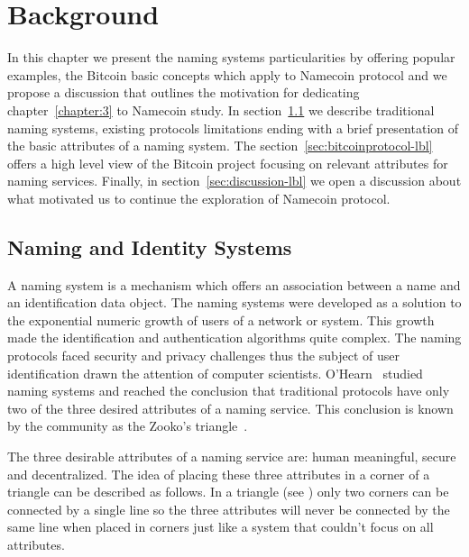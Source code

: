 \chapter{Background}
\label{chapter:2}


In this chapter we present the naming systems particularities by offering popular examples, the Bitcoin basic concepts which apply to Namecoin protocol and we propose a discussion that outlines the motivation for dedicating chapter~\ref{chapter:3} to Namecoin study. In section~\ref{sec:nmc-lbl} we describe traditional naming systems, existing protocols limitations ending with a brief presentation of the basic attributes of a naming system. The section~\ref{sec:bitcoinprotocol-lbl} offers a high level view of the Bitcoin project focusing on relevant attributes for naming services.
Finally, in section~\ref{sec:discussion-lbl} we open a discussion about what motivated us to continue the exploration of Namecoin protocol.

\section{Naming and Identity Systems}
\label{sec:nmc-lbl}
A naming system is a mechanism which offers an association between a name and an identification data object. The naming systems were developed as a solution to the exponential numeric growth of users of a network or system. This growth made the identification and authentication algorithms quite complex. The naming protocols faced security and privacy challenges thus the subject of user identification drawn the attention of computer scientists. O’Hearn~\cite{wilcox2001names} studied naming systems and reached the conclusion that traditional protocols have only two of the three desired attributes of a naming service. This conclusion is known by the community as the Zooko’s triangle~\cite{wilcox2001names}.

The three desirable attributes of a naming service are: human meaningful, secure and decentralized. The idea of placing these three attributes in a corner of a triangle can be described as follows. In a triangle (see ) only two corners can be connected by a single line so the three attributes will never be connected by the same line when placed in corners just like a system that couldn’t focus on all attributes.

